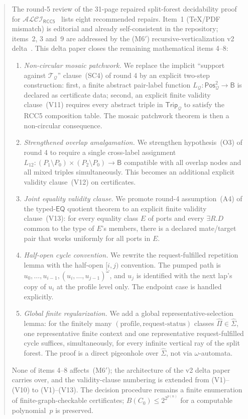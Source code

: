 \documentclass[11pt]{article}
\theoremstyle{definition}
\theoremstyle{remark}
\newcommand{\EQ}{\mathsf{EQ}}
\newcommand{\Base}{\mathsf{B}}
\newcommand{\ALCIRCC}[1]{\mathcal{ALCI}_{\mathsf{RCC#1}}}
\newcommand{\Pos}{\mathsf{Pos}}
\newcommand{\Trip}{\mathsf{Trip}}
\newcommand{\Q}{\mathcal{Q}}
\newcommand{\T}{\mathcal{T}}
\newcommand{\extProf}{\widehat\Pi}
\newcommand{\extSigma}{\widehat\Sigma}
\begin{document}
\begin{abstract}
The round-5 review of the 31-page repaired split-forest decidability
proof~\cite{GPT55Repaired} for $\ALCIRCC{5}$~\cite{GPT55Round5Review}
lists eight recommended repairs.  Item~1 (TeX/PDF mismatch) is
editorial and already self-consistent in the repository; items~2, 3
and~9 are addressed by the (M6$'$) recursive-verticalization v2
delta~\cite{V2Delta}.  This delta paper closes the remaining
mathematical items 4--8:
\begin{enumerate}[label=(\arabic*),leftmargin=2em]
\item[\textbf{4.}] \emph{Non-circular mosaic patchwork.}  We replace
the implicit ``support against $\T_\Q$'' clause~(SC4) of round 4 by
an explicit two-step construction: first, a finite abstract
pair-label function $L_\Q:\Pos_\Q^2\to\Base$ is declared as
certificate data; second, an explicit finite validity clause~(V11)
requires every abstract triple in $\Trip_\Q$ to satisfy the RCC5
composition table.  The mosaic patchwork theorem is then a
non-circular consequence.
\item[\textbf{5.}] \emph{Strengthened overlap amalgamation.}  We
strengthen hypothesis~(O3) of round 4 to require a single
cross-label assignment $L_{12}:(P_1\setminus P_0)\times(P_2\setminus
P_0)\to\Base$ compatible with all overlap nodes and all mixed
triples simultaneously.  This becomes an additional explicit
validity clause~(V12) on certificates.
\item[\textbf{6.}] \emph{Joint equality validity clause.}  We
promote round-4 assumption~(A4) of the typed-$\EQ$ quotient theorem
to an explicit finite validity clause~(V13): for every equality
class $E$ of ports and every $\exists R.D$ common to the type of
$E$'s members, there is a declared mate/target pair that works
uniformly for all ports in $E$.
\item[\textbf{7.}] \emph{Half-open cycle convention.}  We rewrite
the request-fulfilled repetition lemma with the half-open
$[i,j)$ convention.  The pumped path is $u_0,\ldots,u_{i-1},
(u_i,\ldots,u_{j-1})^\omega$, and $u_j$ is identified with the next
lap's copy of $u_i$ at the profile level only.  The endpoint case
is handled explicitly.
\item[\textbf{8.}] \emph{Global finite regularization.}  We add a
global representative-selection lemma: for the finitely many
$(\text{profile},\text{request-status})$ classes
$\extProf\in\extSigma$, one representative finite context and one
representative request-fulfilled cycle suffices, simultaneously,
for every infinite vertical ray of the split forest.  The proof is
a direct pigeonhole over $\extSigma$, not via $\omega$-automata.
\end{enumerate}
None of items 4--8 affects~(M6$'$); the architecture of the v2
delta paper carries over, and the validity-clause numbering is
extended from (V1)--(V10) to (V1)--(V13).  The decision procedure
remains a finite enumeration of finite-graph-checkable certificates;
$B(C_0)\leq 2^{2^{p(n)}}$ for a computable polynomial~$p$ is
preserved.
\end{abstract}
\end{document}
